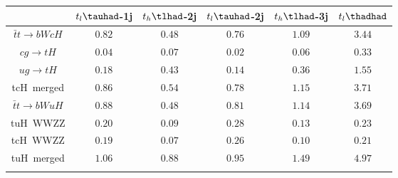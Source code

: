 \centering
\begin{tabular}{cccccc} \toprule\toprule
 & $t_{l}\tauhad$-1j & $t_{h}\tlhad$-2j & $t_{l}\tauhad$-2j & $t_{h}\tlhad$-3j & $t_{l}\thadhad$\\\midrule
$\bar{t}t\to bWcH$ & $0.82$ & $0.48$ & $0.76$ & $1.09$ & $3.44$\\
$cg\to tH$ & $0.04$ & $0.07$ & $0.02$ & $0.06$ & $0.33$\\
$ug\to tH$ & $0.18$ & $0.43$ & $0.14$ & $0.36$ & $1.55$\\
tcH~merged & $0.86$ & $0.54$ & $0.78$ & $1.15$ & $3.71$\\
$\bar{t}t\to bWuH$ & $0.88$ & $0.48$ & $0.81$ & $1.14$ & $3.69$\\
tuH~WWZZ & $0.20$ & $0.09$ & $0.28$ & $0.13$ & $0.23$\\
tcH~WWZZ & $0.19$ & $0.07$ & $0.26$ & $0.10$ & $0.21$\\
tuH~merged & $1.06$ & $0.88$ & $0.95$ & $1.49$ & $4.97$\\
\bottomrule\bottomrule\\
\end{tabular}
